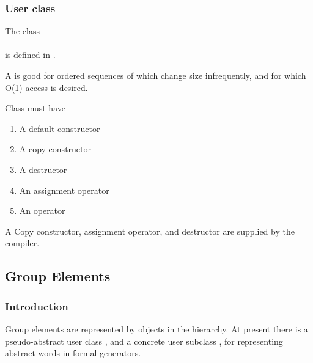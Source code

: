 \subsubsection{User class }


\noindent The class\\
\\
is defined in .

\noindent A  is good for ordered sequences of 
which change size infrequently, and for which O(1) access is desired.




\noindent Class  must have

\begin{enumerate}
\item
A default constructor
\item
A copy constructor
\item
A destructor
\item
An assignment operator
\item
An \code{==} operator
\end{enumerate}

\noindent A Copy constructor, assignment operator,
and destructor are supplied by the compiler.



\subsection{Group Elements}



\subsubsection{Introduction}

Group elements are represented by objects in the  hierarchy.
At present there is a pseudo-abstract user class , and a
concrete user subclass , for representing abstract words in
formal generators.


